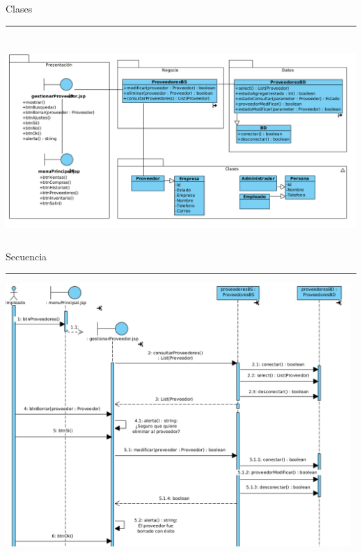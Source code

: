 {
\begin{flushleft}
	\break
	\Large{Clases}\\
	\rule{14cm}{0.5pt}

	\includegraphics[height=8cm]{casouso/cu1.4.3/images/clases.png}\\	

	\Large{Secuencia}\\
	\rule{14cm}{0.5pt}

	\includegraphics[height=10cm]{casouso/cu1.4.3/images/secuencia.png}\\	
	
\end{flushleft}
}